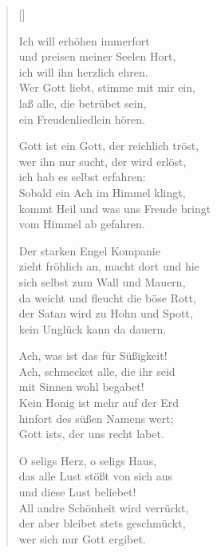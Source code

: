 \begin{multicols}{2}
\settowidth{\versewidth}{Gott ist ein Gott, der reichlich tröst't,}
\begin{verse}[\versewidth]

 Ich will erhöhen immerfort\\
und preisen meiner Seelen Hort,\\
ich will ihn herzlich ehren.\\
Wer Gott liebt, stimme mit mir ein,\\
laß alle, die betrübet sein,\\
ein Freudenliedlein hören.

 Gott ist ein Gott, der reichlich tröst,\\
wer ihn nur sucht, der wird erlöst,\\
ich hab es selbst erfahren:\\
Sobald ein Ach im Himmel klingt,\\
kommt Heil und was uns Freude bringt\\
vom Himmel ab gefahren.

 Der starken Engel Kompanie\\
zieht fröhlich an, macht dort und hie\\
sich selbst zum Wall und Mauern,\\
da weicht und fleucht die böse Rott,\\
der Satan wird zu Hohn und Spott,\\
kein Unglück kann da dauern.

 Ach, was ist das für Süßigkeit!\\
Ach, schmecket alle, die ihr seid\\
mit Sinnen wohl begabet!\\
Kein Honig ist mehr auf der Erd\\
hinfort des süßen Namens wert;\\
Gott ists, der uns recht labet.

 O seligs Herz, o seligs Haus,\\
das alle Lust stößt von sich aus\\
und diese Lust beliebet!\\
All andre Schönheit wird verrückt,\\
der aber bleibet stets geschmückt,\\
wer sich nur Gott ergibet.


\end{verse}
\end{multicols}
